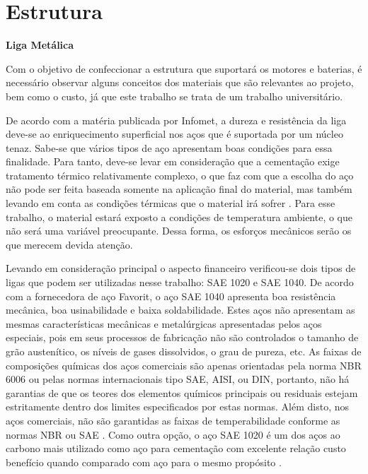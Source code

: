 \section{Estrutura}

	\textbf{Liga Metálica}


	Com o objetivo de confeccionar a estrutura que suportará os motores e baterias, é necessário observar alguns conceitos dos materiais que são relevantes ao projeto, bem como o custo, já que este trabalho se trata de um trabalho universitário.

	De acordo com a matéria publicada por Infomet, a dureza e resistência da liga deve-se ao enriquecimento superficial nos aços que é suportada por um núcleo tenaz. Sabe-se que vários tipos de aço apresentam boas condições para essa finalidade. Para tanto, deve-se levar em consideração que a cementação exige tratamento térmico relativamente complexo, o que faz com que a escolha do aço não pode ser feita baseada somente na aplicação final do material, mas também levando em conta as condições térmicas que o material irá sofrer \cite{ensaio_fadiga}. Para esse trabalho, o material estará exposto a condições de temperatura ambiente, o que não será uma variável preocupante. Dessa forma, os esforços mecânicos serão os que merecem devida atenção.

	Levando em consideração principal o aspecto financeiro verificou-se dois tipos de ligas que podem ser utilizadas nesse trabalho: SAE 1020 e SAE 1040. De acordo com a fornecedora de aço Favorit, o aço SAE 1040 apresenta boa resistência mecânica, boa usinabilidade e baixa soldabilidade. Estes aços não apresentam as mesmas características mecânicas e metalúrgicas apresentadas pelos aços especiais, pois em seus processos de fabricação não são controlados o tamanho de grão austenítico, os níveis de gases dissolvidos, o grau de pureza, etc. As faixas de composições químicas dos aços comerciais são apenas orientadas pela norma NBR 6006 ou pelas normas internacionais tipo SAE, AISI, ou DIN, portanto, não há garantias de que os teores dos elementos químicos principais ou residuais estejam estritamente dentro dos limites especificados por estas normas. Além disto, nos aços comerciais, não são garantidas as faixas de temperabilidade conforme as normas NBR ou SAE \cite{favorit}. Como outra opção, o aço SAE 1020 é um dos aços ao carbono mais utilizado como aço para cementação com excelente relação custo benefício quando comparado com aço para o mesmo propósito \cite{metals}.

